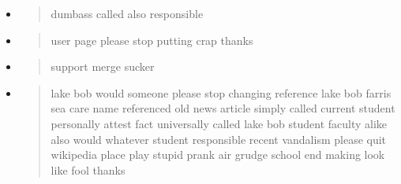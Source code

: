 \documentclass[14pt]{extarticle}
\begin{document}
\begin{itemize}
\begin{itemize}
    \item \begin{quote} dumbass called also responsible \end{quote}
    \item \begin{quote} user page please stop putting crap thanks \end{quote}
    \item \begin{quote} support merge sucker \end{quote}
    \item \begin{quote} lake bob would someone please stop changing reference lake bob farris sea care name referenced old news article simply called current student personally attest fact universally called lake bob student faculty alike also would whatever student responsible recent vandalism please quit wikipedia place play stupid prank air grudge school end making look like fool thanks \end{quote}
\end{itemize}



\end{itemize}
\end{document}
